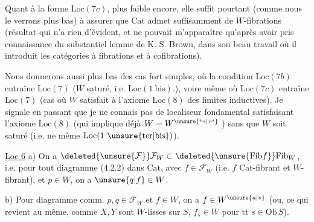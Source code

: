 Quant à la forme $\mathrm{Loc}(7c)$, plus faible
encore, elle suffit pourtant (comme nous
le verrons plus bas) à assurer que
$\mathrm{Cat}$ admet suffisamment de $W$-fibrations
(résultat qui n'a rien d'évident, et ne pouvait
m'apparaître qu'après avoir pris connaissance
du substantiel lemme de K. S. Brown,
dans son beau travail où il introduit les
catégories à fibrations et à cofibrations).

Nous donnerons aussi plus bas des cas
fort simples, où la condition $\mathrm{Loc}(7b)$ 
entraîne  $\mathrm{Loc}(7)$ ($W$  saturé, i.e.
$\mathrm{Loc}(1\ \mathrm{bis})$.), voire même où $\mathrm{Loc}(7c)$
entraîne $\mathrm{Loc}(7)$ (cas où $W$ satisfait à
l'axiome  $\mathrm{Loc}(8)$ des limites inductives).
Je signale en passant que je ne connais
pas de localiseur fondamental satisfaisant
l'axiome $\mathrm{Loc}(8)$ (qui implique déjà $W=W^{\unsure{\leftrightarrows|\rightleftarrows}}$ )
sans que $W$ soit  saturé \deleted{\unsure{(}} (i.e. ne
 même $\mathrm{Loc}(1\ \unsure{\mathrm{ter}|\mathrm{bis}})$).

\uline{Loc 6} \quad a)  On a $\deleted{\unsure{\mathcal F}}\mathcal F_W\subset\deleted{\unsure{\mathrm{Fib}f}}\mathrm{Fib}_W$, i.e. pour
tout diagramme  (4.2.2) dans $\mathrm{Cat}$,
avec $f\in\mathcal F_W$ (i.e. $f$ Cat-fibrant et  $W$-fibrant),
et $p\in W$, on a $\unsure{q|f}\in W$.

b) Pour  diagramme comm.
$p,q\in\mathcal F_W$ et $f\in W$, on a $f\in W^{\unsure{u|v}}$ (ou,
ce qui revient au même,  comme $X,Y$ sont
$W$-lisses sur $S$, $f_s\in W$ pour tt $s\in\mathrm{Ob}\, S$).

